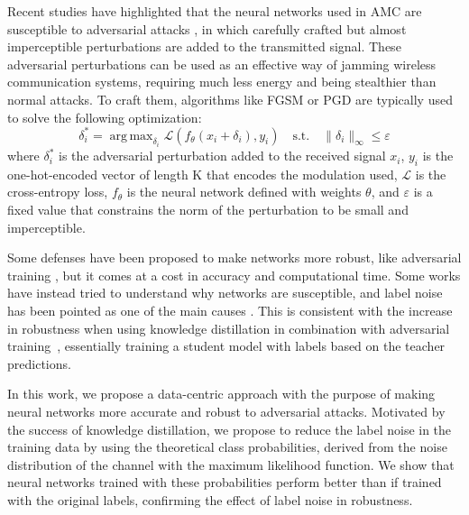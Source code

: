 \documentclass[conference]{IEEEtran}
\newcommand{\Ls}{\mathcal{L}}
\DeclareMathOperator*{\argmax}{arg\,max}
\begin{document}
%
Recent studies have highlighted that the neural networks used in AMC are susceptible to adversarial attacks \cite{Szegedy_Zaremba_Sutskever_Bruna_Erhan_Goodfellow_Fergus_2014, moosavi2017universal,Sadeghi_Larsson_2019,Lin_Zhao_2020,Flowers_Buehrer_Headley_2019, maroto2021benefits}, in which carefully crafted but almost imperceptible perturbations are added to the transmitted signal. These adversarial perturbations can be used as an effective way of jamming wireless communication systems, requiring much less energy and being stealthier than normal attacks. To craft them, algorithms like FGSM \cite{Goodfellow_Shlens_Szegedy_2015} or PGD \cite{Madry_Makelov_Schmidt_Tsipras_Vladu_2019} are typically used to solve the following optimization:
\begin{equation}
\label{eq:adv_pert}
    \delta_i^* = \argmax_{\delta_i}\Ls(f_{\theta}(x_i + \delta_i), y_i) \quad \text{s.t.} \quad \lVert \delta_i \rVert_{\infty} \leq \varepsilon
\end{equation}
where $\delta_i^*$ is the adversarial perturbation added to the received signal $x_i$, $y_i$ is the one-hot-encoded vector of length K that encodes the modulation used, $\Ls$ is the cross-entropy loss, $f_{\theta}$ is the neural network defined with weights $\theta$, and $\varepsilon$ is a fixed value that constrains the norm of the perturbation to be small and imperceptible.

Some defenses have been proposed to make networks more robust, like adversarial training \cite{Madry_Makelov_Schmidt_Tsipras_Vladu_2019}, but it comes at a cost in accuracy and computational time. Some works have instead tried to understand why networks are susceptible, and label noise has been pointed as one of the main causes \cite{sanyal2020benign}. This is consistent with the increase in robustness when using knowledge distillation in combination with adversarial training~\cite{goldblum2020adversarially,zi2021revisiting,shao2021and,maroto2022benefits}, essentially training a student model with labels based on the teacher predictions.

In this work, we propose a data-centric approach with the purpose of making neural networks more accurate and robust to adversarial attacks. Motivated by the success of knowledge distillation, we propose to reduce the label noise in the training data by using the theoretical class probabilities, derived from the noise distribution of the channel with the maximum likelihood function. We show that neural networks trained with these probabilities perform better than if trained with the original labels, confirming the effect of label noise in robustness.
\end{document}
